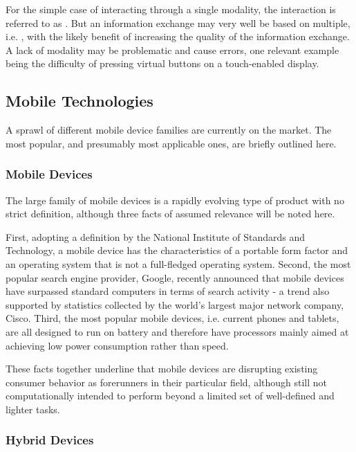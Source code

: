 For the simple case of interacting through a single modality, the interaction is referred to as . But an information exchange may very well be based on multiple, i.e. , with the likely benefit of increasing the quality of the information exchange. A lack of modality may be problematic and cause errors, one relevant example being the difficulty of pressing virtual buttons on a touch-enabled display.

\subsection{Mobile Technologies}

A sprawl of different mobile device families are currently on the market. The most popular, and presumably most applicable ones, are briefly outlined here.


\subsubsection{Mobile Devices}

The large family of mobile devices is a rapidly evolving type of product with no strict definition, although three facts of assumed relevance will be noted here. 

First, adopting a definition by the National Institute of Standards and Technology\cite{NIST}, a mobile device has the characteristics of a portable form factor and an operating system that is not a full-fledged operating system. Second, the most popular search engine provider, Google, recently announced\cite{gSearchMob} that mobile devices have surpassed standard  computers in terms of search activity - a trend also supported by statistics collected by the world's largest major network company, Cisco\cite{ciscoStats}. Third, the most popular mobile devices, i.e. current phones and tablets, are all designed to run on battery and therefore have processors  mainly aimed at achieving low power consumption rather than speed.  

These facts together underline that  mobile devices are  disrupting existing consumer behavior as forerunners in their particular field, although still not computationally intended to perform beyond a limited set of well-defined and lighter tasks.  

\subsubsection{Hybrid Devices}

